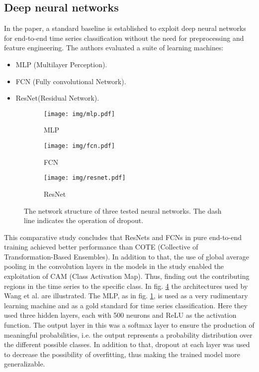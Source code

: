 		\subsection{Deep neural networks}\label{subsec:dnn}
			In the paper\cite{yang2019time}, a standard baseline is established to exploit deep neural networks for end-to-end time series classification without the need for preprocessing and feature engineering. The authors evaluated a suite of learning machines:
			\begin{itemize}
				\item MLP (Multilayer Perception).
				\item FCN (Fully convolutional Network).
				\item ResNet(Residual Network).
			\end{itemize}
			\begin{figure}
				\centering
				\begin{subfigure}[b]{0.25\textwidth}
					\centering
					\texttt{[image: img/mlp.pdf]}
					\caption{MLP}
					\label{fig:wang2017timemlp}
				\end{subfigure}
				\hfill
				\begin{subfigure}[b]{0.25\textwidth}
					\centering
					\texttt{[image: img/fcn.pdf]}
					\caption{FCN}
					\label{fig:wang2017timefcn}
				\end{subfigure}
				\hfill
				\begin{subfigure}[b]{0.3\textwidth}
					\centering
					\texttt{[image: img/resnet.pdf]}
					\caption{ResNet}
					\label{fig:wang2017timeresnet}
				\end{subfigure}
				\caption{The network structure of three tested neural networks. The dash line indicates the operation of dropout\cite{wang2017time}.}
				\label{fig:wang2017time}
			\end{figure}
			This comparative study concludes that ResNets and FCNs in pure end-to-end training achieved better performance than COTE (Collective of \\Transformation-Based Ensembles)\cite{2015TSClassificationCOTE}. In addition to that, the use of global average pooling in the convolution layers in the models in the study enabled the exploitation of CAM (Class Activation Map). Thus, finding out the contributing regions in the time series to the specific class\cite{wang2017time}. In fig. \ref{fig:wang2017time} the architectures used by Wang et al. are illustrated.\newline
			The MLP, as in fig. \ref{fig:wang2017timemlp}, is used as a very rudimentary learning machine and as a gold standard for time series classification. Here they used three hidden layers, each with 500 neurons and ReLU as the activation function. The output layer in this was a softmax layer to ensure the production of meaningful probabilities, i.e. the output represents a probability distribution over the different possible classes.\cite{wang2017time} In addition to that, dropout at each layer was used to decrease the possibility of overfitting, thus making the trained model more generalizable.\newline
